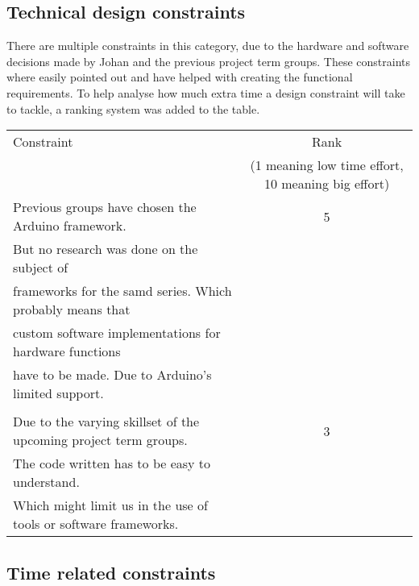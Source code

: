 \subsection{Technical design constraints}
There are multiple constraints in this category, due to the hardware and software decisions made by Johan and the previous project term groups. These constraints where easily pointed out and have helped with creating the functional requirements. To help analyse how much extra time a design constraint will take to tackle, a ranking system was added to the table.\\
\begin{tabular}{|l|c|}
\hline
    Constraint & Rank \\
               & (1 meaning low time effort, 10 meaning big effort) \\
    \hline\hline
     Previous groups have chosen the Arduino framework. & 5\\
     But no research was done on the subject of \\frameworks for the samd series. Which probably means that \\ custom software implementations for hardware functions \\have to be made. Due to Arduino's limited support.\\ & \\
     \hline
     Due to the varying skillset of the upcoming project term groups. & 3\\
     The code written has to be easy to understand. \\ Which might limit us in the use of tools or software frameworks.\\
     \hline
     
     
     
     
\end{tabular}

\subsection{Time related constraints}